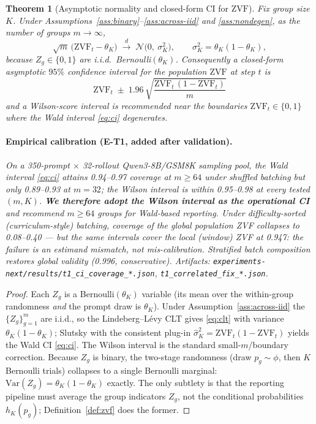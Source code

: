 \documentclass[11pt]{article}
\theoremstyle{plain}
\newtheorem{theorem}{Theorem}
\theoremstyle{definition}
\theoremstyle{remark}
\newcommand{\ZVF}{\ensuremath{\mathrm{ZVF}}}
\newcommand{\Var}{\ensuremath{\mathrm{Var}}}
\newcommand{\1}{\mathbb{1}}
\begin{document}
\begin{theorem}[Asymptotic normality and closed-form CI for \ZVF{}]
\label{thm:T1}
Fix group size $K$. Under Assumptions~\ref{ass:binary}--\ref{ass:across-iid}
and \ref{ass:nondegen}, as the number of groups $m\to\infty$,
\begin{equation}\label{eq:clt}
\sqrt{m}\,\big(\ZVF_t - \theta_K\big)
\;\xrightarrow{\;d\;}\; \mathcal{N}\!\big(0,\ \sigma_K^2\big),
\qquad
\sigma_K^2 = \theta_K(1-\theta_K),
\end{equation}
because $Z_g\in\{0,1\}$ are i.i.d.\ Bernoulli$(\theta_K)$. Consequently a
closed-form asymptotic $95\%$ confidence interval for the population \ZVF{} at
step $t$ is
\begin{equation}\label{eq:ci}
\boxed{\;
\ZVF_t \;\pm\; 1.96\,\sqrt{\frac{\ZVF_t\,(1-\ZVF_t)}{m}}\;}
\end{equation}
and a Wilson-score interval is recommended near the boundaries
$\ZVF_t\in\{0,1\}$ where the Wald interval \eqref{eq:ci} degenerates.

\paragraph{Empirical calibration (E-T1, added after validation).} On a
350-prompt $\times$ 32-rollout Qwen3-8B/GSM8K sampling pool, the Wald
interval \eqref{eq:ci} attains 0.94--0.97 coverage at $m\ge 64$ under
shuffled batching but only 0.89--0.93 at $m=32$; the Wilson interval is
within 0.95--0.98 at every tested $(m,K)$. \textbf{We therefore adopt the
Wilson interval as the operational CI} and recommend $m\ge 64$ groups for
Wald-based reporting. Under difficulty-\emph{sorted} (curriculum-style)
batching, coverage of the \emph{global} population ZVF collapses to
0.08--0.40 --- but the same intervals cover the \emph{local} (window)
ZVF at 0.947: the failure is an estimand mismatch, not mis-calibration.
Stratified batch composition restores global validity (0.996, conservative).
Artifacts: \texttt{experiments-next/results/t1\_ci\_coverage\_*.json},
\texttt{t1\_correlated\_fix\_*.json}.
\end{theorem}
\begin{proof}
Each $Z_g$ is a Bernoulli$(\theta_K)$ variable (its mean over the within-group
randomness \emph{and} the prompt draw is $\theta_K$). Under
Assumption~\ref{ass:across-iid} the $\{Z_g\}_{g=1}^m$ are i.i.d., so the
Lindeberg--L\'evy CLT gives \eqref{eq:clt} with variance
$\theta_K(1-\theta_K)$; Slutsky with the consistent plug-in
$\widehat\sigma_K^2=\ZVF_t(1-\ZVF_t)$ yields the Wald CI \eqref{eq:ci}.
The Wilson interval is the standard small-$m$/boundary correction.
Because $Z_g$ is binary, the two-stage randomness (draw $p_g\sim\phi$, then
$K$ Bernoulli trials) collapses to a single Bernoulli marginal:
$\Var(Z_g)=\theta_K(1-\theta_K)$ exactly. The only subtlety is that the
reporting pipeline must average the group indicators $Z_g$, not the conditional
probabilities $h_K(p_g)$; Definition~\ref{def:zvf} does the former.
\end{proof}
\end{document}

